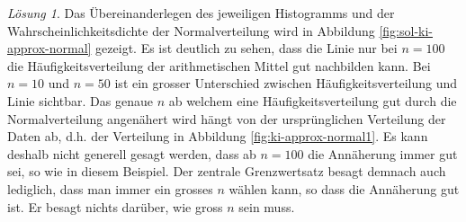 \documentclass[
]{book}
\theoremstyle{definition}
\theoremstyle{definition}
\theoremstyle{definition}
\theoremstyle{definition}
\theoremstyle{remark}
\newtheorem*{solution}{Lösung}
\begin{document}
\begin{solution}

Das Übereinanderlegen des jeweiligen Histogramms und der Wahrscheinlichkeitsdichte der Normalverteilung wird in Abbildung \ref{fig:sol-ki-approx-normal} gezeigt. Es ist deutlich zu sehen, dass die Linie nur bei \(n=100\) die Häufigkeitsverteilung der arithmetischen Mittel gut nachbilden kann. Bei \(n=10\) und \(n=50\) ist ein grosser Unterschied zwischen Häufigkeitsverteilung und Linie sichtbar. Das genaue \(n\) ab welchem eine Häufigkeitsverteilung gut durch die Normalverteilung angenähert wird hängt von der ursprünglichen Verteilung der Daten ab, d.h. der Verteilung in Abbildung \ref{fig:ki-approx-normal1}. Es kann deshalb nicht generell gesagt werden, dass ab \(n=100\) die Annäherung immer gut sei, so wie in diesem Beispiel. Der zentrale Grenzwertsatz besagt demnach auch lediglich, dass man immer ein grosses \(n\) wählen kann, so dass die Annäherung gut ist. Er besagt nichts darüber, wie gross \(n\) sein muss.

\begin{figure}


\end{figure}
\end{solution}
\end{document}
